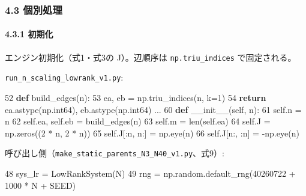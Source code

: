 \documentclass[
  a4paper,
]{ltjsarticle}
\newenvironment{Shaded}{}{}
\newcommand{\BuiltInTok}[1]{\textcolor[rgb]{0.00,0.50,0.00}{#1}}
\newcommand{\ControlFlowTok}[1]{\textcolor[rgb]{0.00,0.44,0.13}{\textbf{#1}}}
\newcommand{\DecValTok}[1]{\textcolor[rgb]{0.25,0.63,0.44}{#1}}
\newcommand{\FunctionTok}[1]{\textcolor[rgb]{0.02,0.16,0.49}{#1}}
\newcommand{\KeywordTok}[1]{\textcolor[rgb]{0.00,0.44,0.13}{\textbf{#1}}}
\newcommand{\NormalTok}[1]{#1}
\newcommand{\OperatorTok}[1]{\textcolor[rgb]{0.40,0.40,0.40}{#1}}
\newcommand{\VariableTok}[1]{\textcolor[rgb]{0.10,0.09,0.49}{#1}}
\begin{document}
\subsubsection{4.3 個別処理}\label{ux500bux5225ux51e6ux7406}

\paragraph{4.3.1 初期化}\label{ux521dux671fux5316}

エンジン初期化（式1・式3の J）。辺順序は \texttt{np.triu\_indices}
で固定される。

\texttt{run\_n\_scaling\_lowrank\_v1.py}:

\begin{Shaded}
\begin{Highlighting}[]
    \DecValTok{52}  \KeywordTok{def}\NormalTok{ build\_edges(n):}
    \DecValTok{53}\NormalTok{      ea, eb }\OperatorTok{=}\NormalTok{ np.triu\_indices(n, k}\OperatorTok{=}\DecValTok{1}\NormalTok{)}
    \DecValTok{54}      \ControlFlowTok{return}\NormalTok{ ea.astype(np.int64), eb.astype(np.int64)}
\NormalTok{...}
    \DecValTok{60}      \KeywordTok{def} \FunctionTok{\_\_init\_\_}\NormalTok{(}\VariableTok{self}\NormalTok{, n):}
    \DecValTok{61}          \VariableTok{self}\NormalTok{.n }\OperatorTok{=}\NormalTok{ n}
    \DecValTok{62}          \VariableTok{self}\NormalTok{.ea, }\VariableTok{self}\NormalTok{.eb }\OperatorTok{=}\NormalTok{ build\_edges(n)}
    \DecValTok{63}          \VariableTok{self}\NormalTok{.m }\OperatorTok{=} \BuiltInTok{len}\NormalTok{(}\VariableTok{self}\NormalTok{.ea)}
    \DecValTok{64}          \VariableTok{self}\NormalTok{.J }\OperatorTok{=}\NormalTok{ np.zeros((}\DecValTok{2} \OperatorTok{*}\NormalTok{ n, }\DecValTok{2} \OperatorTok{*}\NormalTok{ n))}
    \DecValTok{65}          \VariableTok{self}\NormalTok{.J[:n, n:] }\OperatorTok{=}\NormalTok{ np.eye(n)}
    \DecValTok{66}          \VariableTok{self}\NormalTok{.J[n:, :n] }\OperatorTok{=} \OperatorTok{{-}}\NormalTok{np.eye(n)}
\end{Highlighting}
\end{Shaded}

呼び出し側（\texttt{make\_static\_parents\_N3\_N40\_v1.py}、式9）:

\begin{Shaded}
\begin{Highlighting}[]
    \DecValTok{48}\NormalTok{          sys\_lr }\OperatorTok{=}\NormalTok{ LowRankSystem(N)}
    \DecValTok{49}\NormalTok{          rng }\OperatorTok{=}\NormalTok{ np.random.default\_rng(}\DecValTok{40260722} \OperatorTok{+} \DecValTok{1000} \OperatorTok{*}\NormalTok{ N }\OperatorTok{+}\NormalTok{ SEED)}
\end{Highlighting}
\end{Shaded}
\end{document}
